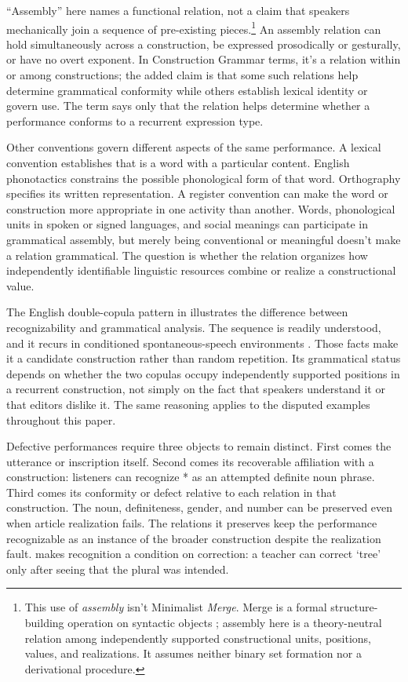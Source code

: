 \documentclass[12pt,letterpaper]{article}
\begin{document}
\enquote{Assembly} here names a functional relation, not a claim that speakers
mechanically join a sequence of pre-existing pieces.\footnote{This use of
\emph{assembly} isn't Minimalist \emph{Merge}. Merge is a formal
structure-building operation on syntactic objects \citep[226]{chomsky1995}; assembly
here is a theory-neutral relation among independently supported constructional
units, positions, values, and realizations. It assumes neither binary set
formation nor a derivational procedure.} An assembly relation can hold
simultaneously across a construction, be expressed prosodically or gesturally, or
have no overt exponent. In Construction Grammar terms, it's a relation within or
among constructions; the added claim is that some such relations help determine
grammatical conformity while others establish lexical identity or govern use. The
term says only that the relation helps determine whether a performance conforms
to a recurrent expression type.

Other conventions govern different aspects of the same performance. A lexical
convention establishes that  is a word with a particular content.
English phonotactics constrains the possible phonological form of that word.
Orthography
specifies its written representation. A register convention can make the word or
construction more appropriate in one activity than another. Words, phonological
units in spoken or signed languages, and social meanings can participate in
grammatical assembly, but merely
being conventional or meaningful doesn't make a relation grammatical. The
question is whether the relation organizes how independently identifiable
linguistic resources combine or realize a constructional value.

The English double-copula pattern in 
illustrates the difference between recognizability and grammatical analysis. The
sequence is readily understood, and it recurs in conditioned spontaneous-speech
environments \citep[\S\S~2.3 and 3.1]{coppockStaum2004double}. Those facts make it a candidate
construction rather than random repetition. Its grammatical status depends on
whether the two copulas occupy independently supported positions in a recurrent
construction, not simply on the fact that speakers understand it or that editors
dislike it. The same reasoning applies to the disputed examples throughout this
paper.

Defective performances require three objects to remain distinct. First comes the
utterance or inscription itself. Second comes its recoverable affiliation
with a construction: listeners can recognize * as an attempted
definite noun phrase. Third comes its conformity or defect relative to each
relation in that construction. The noun, definiteness, gender, and number can be
preserved even when article realization fails. The relations it preserves keep
the performance recognizable as an instance of the broader construction despite
the realization fault. \textcite[25, 97]{coseriu2019} makes recognition a
condition on correction: a teacher can correct  `tree' only after
seeing that the plural  was intended.
\end{document}
